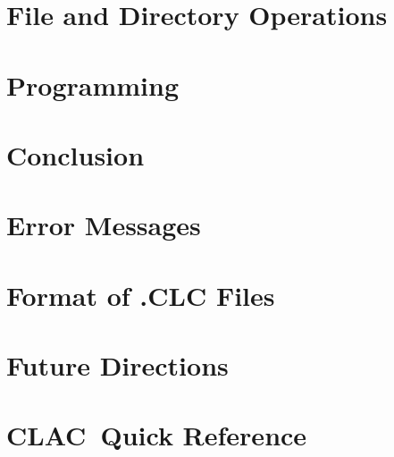 \documentclass{report}
\newcommand{\CLAC}{CLAC}
\begin{document}
\chapter{File and Directory Operations}

\chapter{Programming}

\chapter{Conclusion}

\appendix

\chapter{Error Messages}

\chapter{Format of .CLC Files}

\chapter{Future Directions}

\chapter{\CLAC\ Quick Reference}
\end{document}
